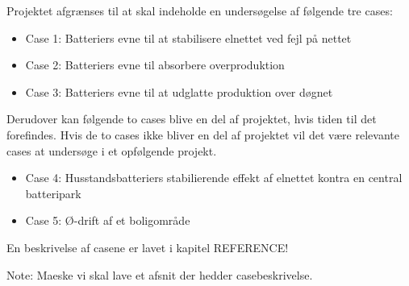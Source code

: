 
Projektet afgrænses til at skal indeholde en undersøgelse af følgende tre cases:
\begin{itemize}
	\item Case 1: Batteriers evne til at stabilisere elnettet ved fejl på nettet
	\item Case 2: Batteriers evne til absorbere overproduktion
	\item Case 3: Batteriers evne til at udglatte produktion over døgnet
\end{itemize}	
	
Derudover kan følgende to cases blive en del af projektet, hvis tiden til det forefindes. Hvis de to cases ikke bliver en del af projektet vil det være relevante cases at undersøge i et opfølgende projekt.
\begin{itemize}
	\item Case 4: Husstandsbatteriers stabilierende effekt af elnettet kontra en central batteripark
	\item Case 5: Ø-drift af et boligområde
\end{itemize}

En beskrivelse af casene er lavet i kapitel REFERENCE!



Note: Maeske vi skal lave et afsnit der hedder casebeskrivelse.